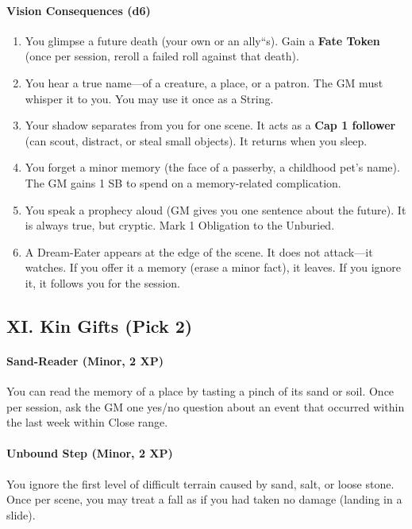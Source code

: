 \documentclass[11pt]{article}
\begin{document}
\paragraph{Vision Consequences (d6)}
\begin{enumerate}[leftmargin=*,nosep]
    \item You glimpse a future death (your own or an ally``s). Gain a \textbf{Fate Token} (once per session, reroll a failed roll against that death).
    \item You hear a true name---of a creature, a place, or a patron. The GM must whisper it to you. You may use it once as a String.
    \item Your shadow separates from you for one scene. It acts as a \textbf{Cap 1 follower} (can scout, distract, or steal small objects). It returns when you sleep.
    \item You forget a minor memory (the face of a passerby, a childhood pet's name). The GM gains 1 SB to spend on a memory-related complication.
    \item You speak a prophecy aloud (GM gives you one sentence about the future). It is always true, but cryptic. Mark 1 Obligation to the Unburied.
    \item A Dream-Eater appears at the edge of the scene. It does not attack---it watches. If you offer it a memory (erase a minor fact), it leaves. If you ignore it, it follows you for the session.
\end{enumerate}

\subsection*{XI. Kin Gifts (Pick 2)}
\paragraph{Sand-Reader (Minor, 2 XP)} You can read the memory of a place by tasting a pinch of its sand or soil. Once per session, ask the GM one yes/no question about an event that occurred within the last week within Close range.

\paragraph{Unbound Step (Minor, 2 XP)} You ignore the first level of difficult terrain caused by sand, salt, or loose stone. Once per scene, you may treat a fall as if you had taken no damage (landing in a slide).
\end{document}
